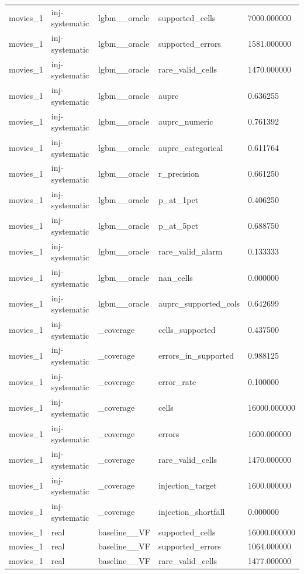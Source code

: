 \begin{tabular}{lllll}
movies\_1 & inj-systematic & lgbm\_\_oracle & supported\_cells & 7000.000000 \\
movies\_1 & inj-systematic & lgbm\_\_oracle & supported\_errors & 1581.000000 \\
movies\_1 & inj-systematic & lgbm\_\_oracle & rare\_valid\_cells & 1470.000000 \\
movies\_1 & inj-systematic & lgbm\_\_oracle & auprc & 0.636255 \\
movies\_1 & inj-systematic & lgbm\_\_oracle & auprc\_numeric & 0.761392 \\
movies\_1 & inj-systematic & lgbm\_\_oracle & auprc\_categorical & 0.611764 \\
movies\_1 & inj-systematic & lgbm\_\_oracle & r\_precision & 0.661250 \\
movies\_1 & inj-systematic & lgbm\_\_oracle & p\_at\_1pct & 0.406250 \\
movies\_1 & inj-systematic & lgbm\_\_oracle & p\_at\_5pct & 0.688750 \\
movies\_1 & inj-systematic & lgbm\_\_oracle & rare\_valid\_alarm & 0.133333 \\
movies\_1 & inj-systematic & lgbm\_\_oracle & nan\_cells & 0.000000 \\
movies\_1 & inj-systematic & lgbm\_\_oracle & auprc\_supported\_cols & 0.642699 \\
movies\_1 & inj-systematic & \_coverage & cells\_supported & 0.437500 \\
movies\_1 & inj-systematic & \_coverage & errors\_in\_supported & 0.988125 \\
movies\_1 & inj-systematic & \_coverage & error\_rate & 0.100000 \\
movies\_1 & inj-systematic & \_coverage & cells & 16000.000000 \\
movies\_1 & inj-systematic & \_coverage & errors & 1600.000000 \\
movies\_1 & inj-systematic & \_coverage & rare\_valid\_cells & 1470.000000 \\
movies\_1 & inj-systematic & \_coverage & injection\_target & 1600.000000 \\
movies\_1 & inj-systematic & \_coverage & injection\_shortfall & 0.000000 \\
movies\_1 & real & baseline\_\_VF & supported\_cells & 16000.000000 \\
movies\_1 & real & baseline\_\_VF & supported\_errors & 1064.000000 \\
movies\_1 & real & baseline\_\_VF & rare\_valid\_cells & 1477.000000 \\

\end{tabular}
